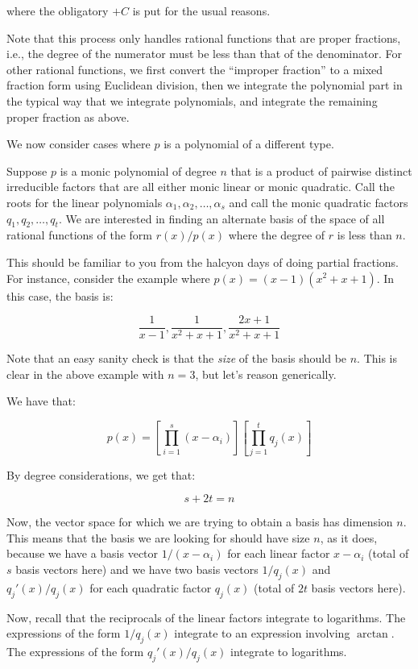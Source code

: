 \documentclass[10pt]{amsart}
\begin{document}
where the obligatory $+C$ is put for the usual reasons.

Note that this process only handles rational functions that are proper
fractions, i.e., the degree of the numerator must be less than that of
the denominator. For other rational functions, we first convert the
``improper fraction'' to a mixed fraction form using Euclidean
division, then we integrate the polynomial part in the typical way
that we integrate polynomials, and integrate the remaining proper
fraction as above.

We now consider cases where $p$ is a polynomial of a different type.

Suppose $p$ is a monic polynomial of degree $n$ that is a product of
pairwise distinct irreducible factors that are all either monic linear
or monic quadratic. Call the roots for the linear polynomials
$\alpha_1, \alpha_2,\dots,\alpha_s$ and call the monic quadratic
factors $q_1,q_2,\dots,q_t$. We are interested in finding an alternate
basis of the space of all rational functions of the form $r(x)/p(x)$
where the degree of $r$ is less than $n$.

This should be familiar to you from the halcyon days of doing partial
fractions. For instance, consider the example where $p(x) = (x -
1)(x^2 + x + 1)$. In this case, the basis is:

$$\frac{1}{x - 1}, \frac{1}{x^2 + x + 1}, \frac{2x + 1}{x^2 + x + 1}$$

Note that an easy sanity check is that the {\em size} of the basis
should be $n$. This is clear in the above example with $n = 3$, but
let's reason generically.

We have that:

$$p(x) = \left[\prod_{i=1}^s (x - \alpha_i)\right]\left[\prod_{j=1}^t q_j(x)\right]$$

By degree considerations, we get that:

$$s + 2t = n$$

Now, the vector space for which we are trying to obtain a basis has
dimension $n$. This means that the basis we are looking for should
have size $n$, as it does, because we have a basis vector $1/(x -
\alpha_i)$ for each linear factor $x - \alpha_i$ (total of $s$ basis
vectors here) and we have two basis vectors $1/q_j(x)$ and
$q_j'(x)/q_j(x)$ for each quadratic factor $q_j(x)$ (total of $2t$
basis vectors here).

Now, recall that the reciprocals of the linear factors integrate to
logarithms. The expressions of the form $1/q_j(x)$ integrate to an
expression involving $\arctan$. The expressions of the form
$q_j'(x)/q_j(x)$ integrate to logarithms.
\end{document}
